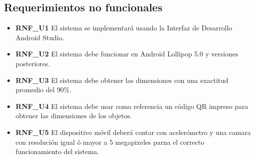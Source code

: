 \subsection{Requerimientos no funcionales}

\begin{itemize}
\item \textbf{RNF\_U1} El sistema se implementará usando la Interfaz de Desarrollo Android Studio.
\item \textbf{RNF\_U2} El sistema debe funcionar en Android Lollipop 5.0 y versiones posteriores.
\item \textbf{RNF\_U3} El sistema debe obtener las dimensiones con una exactitud promedio del 90\%.
\item \textbf{RNF\_U4} El sistema debe usar como referencia un código QR impreso para obtener las dimensiones de los objetos.
\item \textbf{RNF\_U5} El dispositivo móvil deberá contar con acelerómetro y una camara con resolución igual ó mayor a 5 megapixeles parna el correcto funcionamiento del sistema.

\end{itemize}